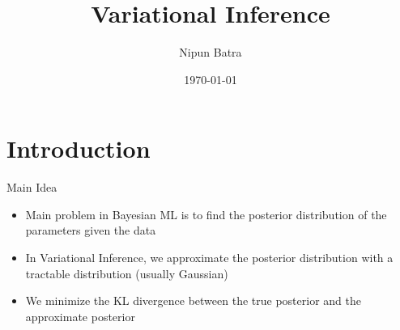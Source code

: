 \documentclass[handout]{beamer}
\begin{document}
\title{Variational Inference}
\author{Nipun Batra}
\date{\today}
\maketitle

\section{Introduction}

\begin{frame}{Main Idea}
    \begin{itemize}
        \item Main problem in Bayesian ML is to find the posterior distribution of the parameters given the data
        \item In Variational Inference, we approximate the posterior distribution with a tractable distribution (usually Gaussian)
        \item We minimize the KL divergence between the true posterior and the approximate posterior
    \end{itemize}
    
\end{frame}
\end{document}
